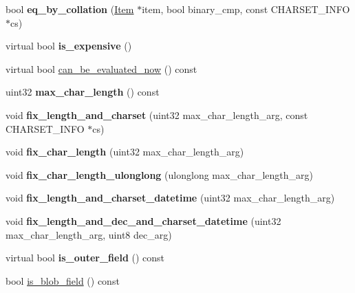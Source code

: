 \begin{DoxyCompactItemize}
bool {\bfseries eq\+\_\+by\+\_\+collation} (\mbox{\hyperlink{classItem}{Item}} $\ast$item, bool binary\+\_\+cmp, const C\+H\+A\+R\+S\+E\+T\+\_\+\+I\+N\+FO $\ast$cs)
\item 
\mbox{\label{classItem_a655332b412ecd77436ba935ad8c681ed}} 
virtual bool {\bfseries is\+\_\+expensive} ()
\item 
virtual bool \mbox{\hyperlink{classItem_a714b4a2e3278f84b2ddb9e65c7fddaff}{can\+\_\+be\+\_\+evaluated\+\_\+now}} () const
\item 
\mbox{\label{classItem_a043b505a2cb034a2228f13c4366f05e7}} 
uint32 {\bfseries max\+\_\+char\+\_\+length} () const
\item 
\mbox{\label{classItem_ae48d802adeb480452f0869228c63e3e1}} 
void {\bfseries fix\+\_\+length\+\_\+and\+\_\+charset} (uint32 max\+\_\+char\+\_\+length\+\_\+arg, const C\+H\+A\+R\+S\+E\+T\+\_\+\+I\+N\+FO $\ast$cs)
\item 
\mbox{\label{classItem_a246c6f63e5c643a661cb2525706c32c4}} 
void {\bfseries fix\+\_\+char\+\_\+length} (uint32 max\+\_\+char\+\_\+length\+\_\+arg)
\item 
\mbox{\label{classItem_ab958dd079148cdbfc968462f230301b4}} 
void {\bfseries fix\+\_\+char\+\_\+length\+\_\+ulonglong} (ulonglong max\+\_\+char\+\_\+length\+\_\+arg)
\item 
\mbox{\label{classItem_a6d1ddaecb6a736f552f58ac4ed867816}} 
void {\bfseries fix\+\_\+length\+\_\+and\+\_\+charset\+\_\+datetime} (uint32 max\+\_\+char\+\_\+length\+\_\+arg)
\item 
\mbox{\label{classItem_a61f1e399fcbcdf4c95b4caadd6a063a5}} 
void {\bfseries fix\+\_\+length\+\_\+and\+\_\+dec\+\_\+and\+\_\+charset\+\_\+datetime} (uint32 max\+\_\+char\+\_\+length\+\_\+arg, uint8 dec\+\_\+arg)
\item 
\mbox{\label{classItem_ab55e3e3fe72135bfcddc6d86b6b6f316}} 
virtual bool {\bfseries is\+\_\+outer\+\_\+field} () const
\item 
bool \mbox{\hyperlink{classItem_aa4a4bee673e7e8dedc1c4f7c283188ea}{is\+\_\+blob\+\_\+field}} () const
\item 

\end{DoxyCompactItemize}
